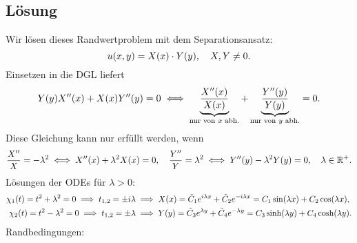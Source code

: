 \documentclass{exercise}
\begin{document}
    \subsection*{Lösung}
    Wir lösen dieses Randwertproblem mit dem Separationsansatz:
    \[
        u\parentheses*{x, y} = X\parentheses*{x} \cdot Y\parentheses*{y}, \quad X, Y \ne 0.
    \]
    Einsetzen in die DGL liefert
    \[
        Y\parentheses*{y}X''\parentheses*{x} + X\parentheses*{x}Y''\parentheses*{y} = 0 \iff \underbrace{\frac{X''\parentheses*{x}}{X\parentheses*{x}}}_{\text{nur von }x\text{ abh.}} + \underbrace{\frac{Y''\parentheses*{y}}{Y\parentheses*{y}}}_{\text{nur von }y\text{ abh.}} = 0.
    \]
    Diese Gleichung kann nur erfüllt werden, wenn
    \[
        \frac{X''}{X} = -\lambda^2 \iff X''\parentheses*{x} + \lambda^2 X\parentheses*{x} = 0, \quad \frac{Y''}{Y} = \lambda^2 \iff Y''\parentheses*{y} - \lambda^2 Y\parentheses*{y} = 0, \quad \lambda \in \R^+.
    \]
    Lösungen der ODEs für \(\lambda > 0\):
    \begin{align*}
        \chi_1\parentheses*{t} = t^2 + \lambda^2 = 0 \implies t_{1, 2} = \pm i\lambda &\implies X\parentheses*{x} = \tilde{C}_1 e^{i\lambda x} + \tilde{C}_2 e^{-i\lambda x} = C_1\sin\parentheses*{\lambda x} + C_2\cos\parentheses*{\lambda x},\\
        \chi_2\parentheses*{t} = t^2 - \lambda^2 = 0 \implies t_{1, 2} = \pm\lambda &\implies Y\parentheses*{y} = \tilde{C}_3 e^{\lambda y} + \tilde{C}_4 e^{-\lambda y} = C_3\sinh\parentheses*{\lambda y} + C_4\cosh\parentheses*{\lambda y}.
    \end{align*}
    Randbedingungen:
\end{document}

